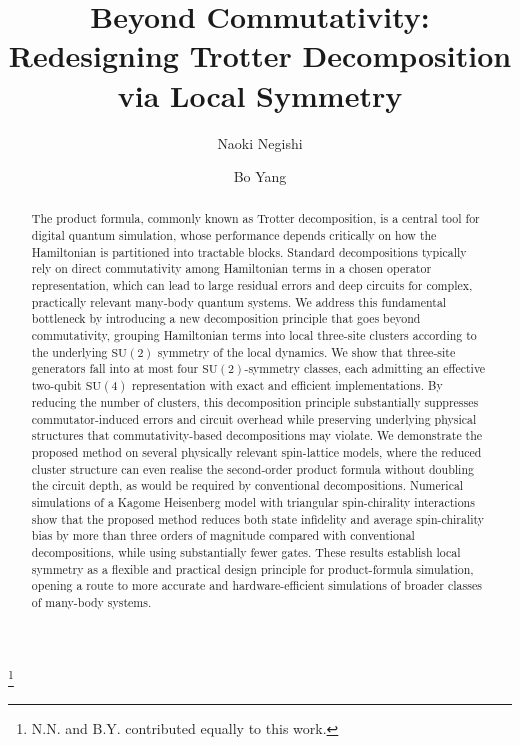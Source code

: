 \documentclass[aps,showpacs,amsmath,amssymb,twocolumn,prx,longbibliography,superscriptaddress,notitlepage,floatfix,10pt]{revtex4-2}
\begin{document}

\title{Beyond Commutativity: Redesigning Trotter Decomposition via Local Symmetry}


\author{Naoki Negishi}

\author{Bo Yang}
\thanks{N.N. and B.Y. contributed equally to this work.}

\begin{abstract}
The product formula, commonly known as Trotter decomposition, is a central tool for digital quantum simulation, whose performance depends critically on how the Hamiltonian is partitioned into tractable blocks.
Standard decompositions typically rely on direct commutativity among Hamiltonian terms in a chosen operator representation, which can lead to large residual errors and deep circuits for complex, practically relevant many-body quantum systems.
We address this fundamental bottleneck by introducing a new decomposition principle that goes beyond commutativity, grouping Hamiltonian terms into local three-site clusters according to the underlying $\mathrm{SU}(2)$ symmetry of the local dynamics.
We show that three-site generators fall into at most four $\mathrm{SU}(2)$-symmetry classes, each admitting an effective two-qubit $\mathrm{SU}(4)$ representation with exact and efficient implementations.
By reducing the number of clusters, this decomposition principle substantially suppresses commutator-induced errors and circuit overhead while preserving underlying physical structures that commutativity-based decompositions may violate.
We demonstrate the proposed method on several physically relevant spin-lattice models, where the reduced cluster structure can even realise the second-order product formula without doubling the circuit depth, as would be required by conventional decompositions.
Numerical simulations of a Kagome Heisenberg model with triangular spin-chirality interactions show that the proposed method reduces both state infidelity and average spin-chirality bias by more than three orders of magnitude compared with conventional decompositions, while using substantially fewer gates.
These results establish local symmetry as a flexible and practical design principle for product-formula simulation, opening a route to more accurate and hardware-efficient simulations of broader classes of many-body systems.
\end{abstract}
\end{document}

